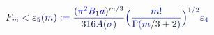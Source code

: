 \documentclass[12pt]{article}
\begin{document}
\makeatletter
\renewcommand*{\@textcolor}[3]{%
  \protect\leavevmode
  \begingroup
    \color#1{#2}#3%
  \endgroup
}
\makeatother
\begin{displaymath}
\mathcolor[RGB]{0,0,15}{F} _ { \mathcolor[RGB]{0,0,30}{m} } \mathcolor[RGB]{0,0,45}{<} \mathcolor[RGB]{0,0,60}{\varepsilon} _ { \mathcolor[RGB]{0,0,75}{5} } \mathcolor[RGB]{0,0,90}{(} \mathcolor[RGB]{0,0,105}{m} \mathcolor[RGB]{0,0,120}{)} \mathcolor[RGB]{0,0,135}{:} \mathcolor[RGB]{0,0,150}{=} \mathcolor[RGB]{0,0,165}{\frac { \mathcolor[RGB]{0,0,180}{(} \mathcolor[RGB]{0,0,195}{\pi} ^ { \mathcolor[RGB]{0,0,210}{2} } \mathcolor[RGB]{0,0,225}{B} _ { \mathcolor[RGB]{0,0,240}{1} } \mathcolor[RGB]{0,0,255}{a} \mathcolor[RGB]{0,15,0}{)} ^ { \mathcolor[RGB]{0,15,15}{m} \mathcolor[RGB]{0,15,30}{/} \mathcolor[RGB]{0,15,45}{3} } } { \mathcolor[RGB]{0,15,60}{3} \mathcolor[RGB]{0,15,75}{1} \mathcolor[RGB]{0,15,90}{6} \mathcolor[RGB]{0,15,105}{A} \mathcolor[RGB]{0,15,120}{(} \mathcolor[RGB]{0,15,135}{\sigma} \mathcolor[RGB]{0,15,150}{)} } } \mathcolor[RGB]{0,15,165}{\Big(} \mathcolor[RGB]{0,15,180}{\frac { \mathcolor[RGB]{0,15,195}{m} \mathcolor[RGB]{0,15,210}{!} } { \mathcolor[RGB]{0,15,225}{\Gamma} \mathcolor[RGB]{0,15,240}{(} \mathcolor[RGB]{0,15,255}{m} \mathcolor[RGB]{0,30,0}{/} \mathcolor[RGB]{0,30,15}{3} \mathcolor[RGB]{0,30,30}{+} \mathcolor[RGB]{0,30,45}{2} \mathcolor[RGB]{0,30,60}{)} } } \mathcolor[RGB]{0,30,75}{\Big)} ^ { \mathcolor[RGB]{0,30,90}{1} \mathcolor[RGB]{0,30,105}{/} \mathcolor[RGB]{0,30,120}{2} } \mathcolor[RGB]{0,30,135}{\varepsilon} _ { \mathcolor[RGB]{0,30,150}{4} }
\end{displaymath}
\end{document}
